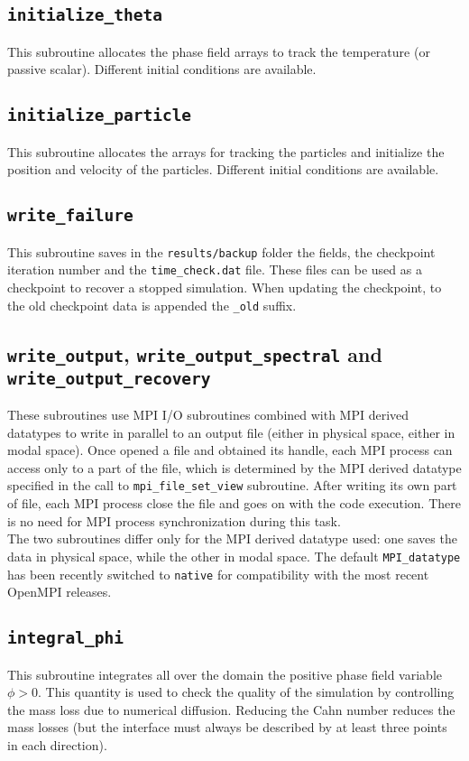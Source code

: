 \subsection{\texttt{initialize\_theta}}
This subroutine allocates the phase field arrays to track the temperature (or passive scalar).
Different initial conditions are available.


\subsection{\texttt{initialize\_particle}}
This subroutine allocates the arrays for tracking the particles and initialize the position and velocity of the particles.
Different initial conditions are available.


\subsection{\texttt{write\_failure}}
This subroutine saves in the \texttt{results/backup} folder the fields, the checkpoint iteration number and the \texttt{time\_check.dat} file. These files can be used as a checkpoint to recover a stopped simulation. When updating the checkpoint, to the old checkpoint data is appended the \texttt{\_old} suffix.

\subsection{\texttt{write\_output}, \texttt{write\_output\_spectral} and \texttt{write\_output\_recovery}}
\label{sec: writeo}
These subroutines use MPI I/O subroutines combined with MPI derived datatypes to write in parallel to an output file (either in physical space, either in modal space). Once opened a file and obtained its handle, each MPI process can access only to a part of the file, which is determined by the MPI derived datatype specified in the call to \texttt{mpi\_file\_set\_view} subroutine. After writing its own part of file, each MPI process close the file and goes on with the code execution. There is no need for MPI process synchronization during this task.\\
The two subroutines differ only for the MPI derived datatype used: one saves the data in physical space, while the other in modal space.
The default \texttt{MPI\_datatype} has been recently switched to \texttt{native} for compatibility with the most recent OpenMPI releases.

\subsection{\texttt{integral\_phi}}
This subroutine integrates all over the domain the positive phase field variable $\phi>0$. This quantity is used to check the quality of the simulation by controlling the mass loss due to numerical diffusion. Reducing the Cahn number reduces the mass losses (but the interface must always be described by at least three points in each direction).

